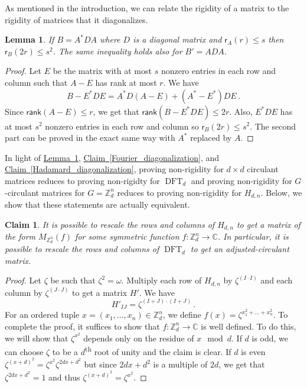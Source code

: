 \documentclass[11pt]{article}
\numberwithin{equation}{section}
\newtheorem{lemma}[theorem]{Lemma}
\newtheorem{claim}[theorem]{Claim}
\theoremstyle{definition}
\theoremstyle{plain}
\newcommand{\C}{\mathbb C}
\newcommand{\Z}{\mathbb Z}
\newcommand{\expref}[2]{\hyperref[#2]{#1~\ref{#2}}}
\theoremstyle{definition}
\renewcommand\Z{{\mathbb{Z}}}
\renewcommand\C{{\mathbb{C}}}
\newcommand\rank{\textsf{rank}}
\newcommand{\ts}{\textsuperscript}
\DeclareMathOperator{\DFT}{DFT}
\begin{document}
As mentioned in the introduction, we can relate the rigidity of a matrix to the rigidity of matrices  that it diagonalizes.
\begin{lemma}\label{diagonalization}
If $B = A^*DA$ where $D$ is a diagonal matrix and $\textsf{r}_A(r) \leq s$ then $\textsf{r}_B(2r) \leq s^2$.  The same inequality holds also for $B' = ADA$.
\end{lemma}
\begin{proof}
Let $E$ be the matrix with at most $s$ nonzero entries in each row and column such that $A - E$ has rank at most $r$.  We have
\[
B - E^*DE = A^*D(A - E) + (A^* - E^*)DE \,.
\]
Since $\rank(A - E) \leq r$, %
we get that %
$\rank(B - E^*DE) \leq 2r$.  Also, $E^*DE$ has at most $s^2$ nonzero entries in each row and column so $\textsf{r}_B(2r) \leq s^2$.  The second part can be proved in the exact same way with $A^*$ replaced by $A$.
\end{proof}  
In light of \expref{Lemma}{diagonalization}, \expref{Claim}{Fourier_diagonalization}, and \expref{Claim}{Hadamard_diagonalization}, proving non-rigidity for $d \times d$ circulant matrices reduces to proving non-rigidty for %
$\DFT_d$ %
 and proving non-rigidity for 
%
$G$-circulant    %
matrices for
%
$G=\Z_d^n$  %
reduces to proving non-rigidity for $H_{d,n}$.  Below, we show that these statements are actually equivalent.

\begin{claim}\label{rescaling}
It is possible to rescale the rows and columns of $H_{d,n}$ to get a matrix of the form $M_{\Z_d^n}(f)$ for some symmetric function $f:\Z_d^n \rightarrow \C$.  In particular, it is possible to rescale the rows and columns of %
$\DFT_d$ %
 to get an adjusted-circulant matrix.
\end{claim}
\begin{proof}
Let $\zeta$ be such that $\zeta^2 = \omega$.  Multiply each row of $H_{d,n}$ by $\zeta^{(I \cdot I)}$ and each column by $\zeta^{(J \cdot J)}$ to get a matrix $H'$.  We have
\[
H'_{IJ} = \zeta^{(I+J) \cdot (I+J)} \,.
\]
For an ordered tuple $x = (x_1, \dots , x_n) \in \Z_d^n$, we define $f(x) = \zeta^{x_1^2 + \dots + x_n^2}$.  To complete the proof, it suffices to show that $f: \Z_d^n \rightarrow \C$ is well defined.  To do this, we will show that $\zeta^{x^2}$ depends only on the residue of $x \mod d$.  If $d$ is odd, we can choose $\zeta$ to be a $d$\ts{th} root of unity and the claim is clear.  If $d$ is even $\zeta^{(x+d)^2} = \zeta^{x^2}\zeta^{2dx + d^2}$ but since $2dx + d^2$ is a multiple of $2d$, %
we get that  %
$\zeta^{2dx + d^2} = 1$ and thus $\zeta^{(x+d)^2} = \zeta^{x^2}$.  
\end{proof}
\end{document}
